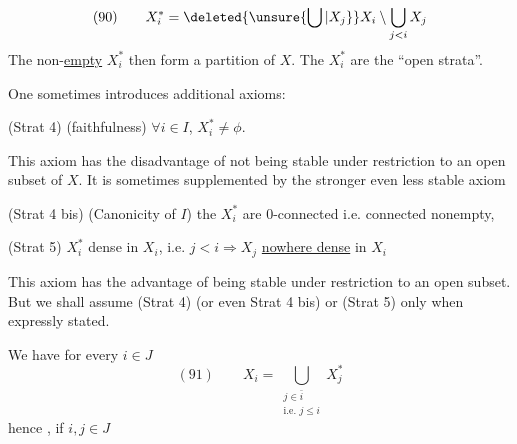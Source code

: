 
\[(90)\qquad X_i^*=\deleted{\unsure{\bigcup|X_j}}X_i\setminus\bigcup_{j<i}X_j\]
The non-\uline{empty} $X_i^*$ then form a partition of $X$. The $X_i^*$ are the ``open strata''.

One sometimes introduces additional axioms:

(Strat 4) (faithfulness) $\forall i\in I$, $X_i^*\neq\phi$.

This axiom has the disadvantage of not being stable under  restriction to an open subset of $X$. It is sometimes supplemented by the stronger even less stable axiom

(Strat 4 bis) (Canonicity of $I$) the $X_i^*$ are $0$-connected i.e. connected nonempty,

(Strat 5)  $X_i^*$ dense in $X_i$,  i.e. $j<i\Rightarrow X_j$ \uline{nowhere dense} in $X_i$

This axiom has the advantage of being stable under restriction to an open subset. But we shall assume (Strat 4) (or even Strat 4 bis) or (Strat 5) only when expressly stated.

We have for every $i\in J$
\[
(91)\qquad X_i=\bigcup_{\substack{j\in\bar i\\\text{i.e. }j\leq i}}X_j^*
\]
hence , if $i,j\in J$

